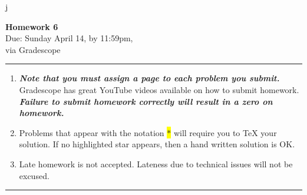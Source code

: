 j\documentclass[12pt]{article}
\newif\ifshow
\begin{document}
\begin{center}
\ifshow
  \textbf{\Large Homework 6 Solution}\\
\else
  \textbf{\Large Homework 6}\\
\fi
Due: Sunday April 14, by 11:59pm,\\via Gradescope\\
\end{center}

\hrule

\vspace{0.2cm}

\begin{enumerate}[$\bullet$]
\item  {\textbf{\textit{Note that you must assign a page to each problem you submit.}}}   Gradescope has great YouTube videos available on how to submit homework.  \textit{\textbf{Failure to submit homework correctly will result in a zero on homework.}}
\item Problems that appear with the notation \colorbox{yellow}{$\ast$} will require you to TeX your solution.  If no highlighted star appears, then a hand written solution is OK.  
\item Late homework is not accepted.  Lateness due to technical issues will not be excused.  
\end{enumerate}

\hrule

\vspace{0.5cm}
\end{document}
